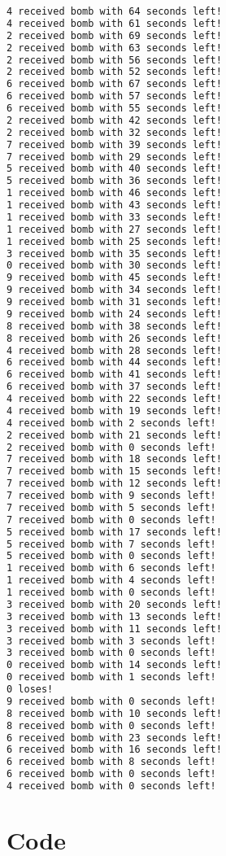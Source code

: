 \documentclass{article}
\begin{document}
\begin{lstlisting}[language=bash]
4 received bomb with 64 seconds left!
4 received bomb with 61 seconds left!
2 received bomb with 69 seconds left!
2 received bomb with 63 seconds left!
2 received bomb with 56 seconds left!
2 received bomb with 52 seconds left!
6 received bomb with 67 seconds left!
6 received bomb with 57 seconds left!
6 received bomb with 55 seconds left!
2 received bomb with 42 seconds left!
2 received bomb with 32 seconds left!
7 received bomb with 39 seconds left!
7 received bomb with 29 seconds left!
5 received bomb with 40 seconds left!
5 received bomb with 36 seconds left!
1 received bomb with 46 seconds left!
1 received bomb with 43 seconds left!
1 received bomb with 33 seconds left!
1 received bomb with 27 seconds left!
1 received bomb with 25 seconds left!
3 received bomb with 35 seconds left!
0 received bomb with 30 seconds left!
9 received bomb with 45 seconds left!
9 received bomb with 34 seconds left!
9 received bomb with 31 seconds left!
9 received bomb with 24 seconds left!
8 received bomb with 38 seconds left!
8 received bomb with 26 seconds left!
4 received bomb with 28 seconds left!
6 received bomb with 44 seconds left!
6 received bomb with 41 seconds left!
6 received bomb with 37 seconds left!
4 received bomb with 22 seconds left!
4 received bomb with 19 seconds left!
4 received bomb with 2 seconds left!
2 received bomb with 21 seconds left!
2 received bomb with 0 seconds left!
7 received bomb with 18 seconds left!
7 received bomb with 15 seconds left!
7 received bomb with 12 seconds left!
7 received bomb with 9 seconds left!
7 received bomb with 5 seconds left!
7 received bomb with 0 seconds left!
5 received bomb with 17 seconds left!
5 received bomb with 7 seconds left!
5 received bomb with 0 seconds left!
1 received bomb with 6 seconds left!
1 received bomb with 4 seconds left!
1 received bomb with 0 seconds left!
3 received bomb with 20 seconds left!
3 received bomb with 13 seconds left!
3 received bomb with 11 seconds left!
3 received bomb with 3 seconds left!
3 received bomb with 0 seconds left!
0 received bomb with 14 seconds left!
0 received bomb with 1 seconds left!
0 loses!
9 received bomb with 0 seconds left!
8 received bomb with 10 seconds left!
8 received bomb with 0 seconds left!
6 received bomb with 23 seconds left!
6 received bomb with 16 seconds left!
6 received bomb with 8 seconds left!
6 received bomb with 0 seconds left!
4 received bomb with 0 seconds left!
\end{lstlisting}

\section{Code}

\end{document}
